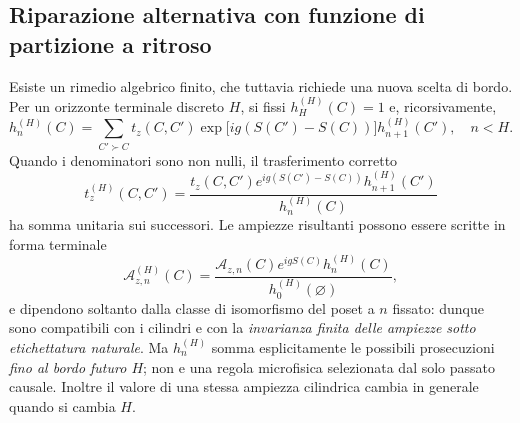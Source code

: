 \documentclass[11pt,a4paper]{article}
\begin{document}
\subsection{Riparazione alternativa con funzione di partizione a ritroso}
Esiste un rimedio algebrico finito, che tuttavia richiede una nuova scelta di bordo. Per un orizzonte terminale discreto $H$, si fissi $h_H^{(H)}(C)=1$ e, ricorsivamente,
\begin{equation}
 h_n^{(H)}(C)=\sum_{C'\succ C}t_z(C,C')\exp\!\bigl[ig(S(C')-S(C))\bigr]h_{n+1}^{(H)}(C'),\quad n<H.
 \label{eq:r12an_backward_recursion}
\end{equation}
Quando i denominatori sono non nulli, il trasferimento corretto
\begin{equation}
 t_z^{(H)}(C,C')=\frac{t_z(C,C')e^{ig(S(C')-S(C))}h_{n+1}^{(H)}(C')}{h_n^{(H)}(C)}
 \label{eq:r12an_future_transfer}
\end{equation}
ha somma unitaria sui successori. Le ampiezze risultanti possono essere scritte in forma terminale
\begin{equation}
 {\mathcal A}_{z,n}^{(H)}(C)=
 \frac{{\mathcal A}_{z,n}(C)e^{igS(C)}h_n^{(H)}(C)}{h_0^{(H)}(\varnothing)},
 \label{eq:r12an_future_amplitude}
\end{equation}
e dipendono soltanto dalla classe di isomorfismo del poset a $n$ fissato: dunque sono compatibili con i cilindri e con la \emph{invarianza finita delle ampiezze sotto etichettatura naturale}. Ma $h_n^{(H)}$ somma esplicitamente le possibili prosecuzioni \emph{fino al bordo futuro $H$}; non e una regola microfisica selezionata dal solo passato causale. Inoltre il valore di una stessa ampiezza cilindrica cambia in generale quando si cambia $H$.
\end{document}
